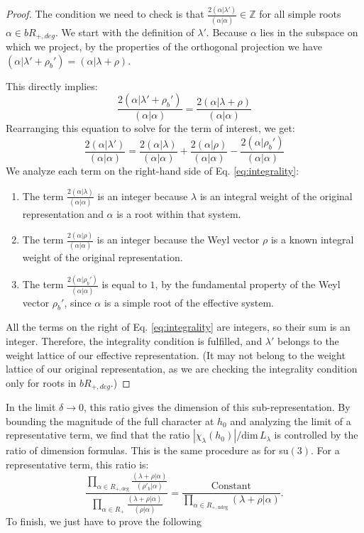 \documentclass[11pt, a4paper]{article}
\newcommand{\dimL}{\mathrm{dim}\,L_\lambda}
\theoremstyle{definition}
\theoremstyle{remark}
\begin{document}
\begin{proof}
The condition we need to check is that $\frac{2(\alpha|\lambda')}{(\alpha|\alpha)}\in\mathbb{Z}$ for all simple roots $\alpha \in bR_{+,deg}$. We start with the definition of $\lambda'$. Because $\alpha$ lies in the subspace on which we project, by the properties of the orthogonal projection we have $(\alpha|\lambda' + \rho_b') = (\alpha|\lambda + \rho)$.

This directly implies:
$$
\frac{2(\alpha|\lambda'+\rho_b')}{(\alpha|\alpha)}=\frac{2(\alpha|\lambda+\rho)}{(\alpha|\alpha)}
$$
Rearranging this equation to solve for the term of interest, we get:
\begin{equation}
    \label{eq:integrality}
    \frac{2(\alpha|\lambda')}{(\alpha|\alpha)}=\frac{2(\alpha|\lambda)}{(\alpha|\alpha)}+\frac{2(\alpha|\rho)}{(\alpha|\alpha)}-\frac{2(\alpha|\rho_b')}{(\alpha|\alpha)}
\end{equation}
We analyze each term on the right-hand side of Eq. \eqref{eq:integrality}:
\begin{enumerate}
    \item The term $\frac{2(\alpha|\lambda)}{(\alpha|\alpha)}$ is an integer because $\lambda$ is an integral weight of the original representation and $\alpha$ is a root within that system.
    \item The term $\frac{2(\alpha|\rho)}{(\alpha|\alpha)}$ is an integer because the Weyl vector $\rho$ is a known integral weight of the original representation.
    \item The term $\frac{2(\alpha|\rho_b')}{(\alpha|\alpha)}$ is equal to $1$, by the fundamental property of the Weyl vector $\rho_b'$, since $\alpha$ is a simple root of the effective system.
\end{enumerate}

All the terms on the right of Eq. \eqref{eq:integrality} are integers, so their sum is an integer. Therefore, the integrality condition is fulfilled, and $\lambda'$ belongs to the weight lattice of our effective representation. (It may not belong to the weight lattice of our original representation, as we are checking the integrality condition only for roots in $bR_{+,deg}$.)
\end{proof}


In the limit $\delta \to 0$, this ratio gives the dimension of this sub-representation. By bounding the magnitude of the full character at $h_0$ and analyzing the limit of a representative term, we find that the ratio $|\chi_\lambda(h_0)|/\dimL$ is controlled by the ratio of dimension formulas. This is the same procedure as for su$(3)$. For a representative term, this ratio is:
\begin{equation}
    \label{eq:boundconst}
    \frac{\prod_{\alpha \in R_{+, \text{deg}}} \frac{(\lambda+\rho|\alpha)}{(\rho'_{b}|\alpha)}}{\prod_{\alpha \in R_{+}} \frac{(\lambda+\rho|\alpha)}{(\rho|\alpha)}} = \frac{\text{Constant}}{\prod_{\alpha \in R_{+, \text{ndeg}}} (\lambda+\rho|\alpha)}.
\end{equation}
To finish, we just have to prove the following
\end{document}
